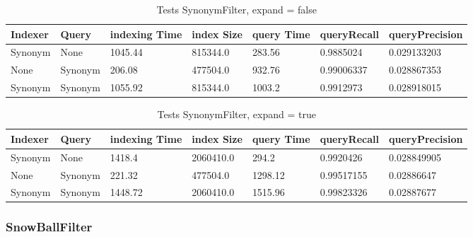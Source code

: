 \begin{table}[!htbp]
    \hspace{-2cm}
                \begin{tabular}{|p{2cm}|p{2cm}|p{2cm}|p{2cm}|p{2.5cm}|p{2.5cm}|p{2.5cm}|}
                    \hline
                    \textbf{Indexer} & \textbf{Query} & \textbf{indexing Time} & \textbf{index Size} & \textbf{query Time} & \textbf{queryRecall} & \textbf{queryPrecision}\\
                    \hline
Synonym & None & 1045.44 & 815344.0 & 283.56 & 0.9885024 & 0.029133203\\
		            \hline
None & Synonym & 206.08 & 477504.0 & 932.76 & 0.99006337 & 0.028867353\\
		            \hline
Synonym & Synonym & 1055.92 & 815344.0 & 1003.2 & 0.9912973 & 0.028918015\\
                    \hline
                \end{tabular}
                \caption{Tests SynonymFilter, expand = false}
                \label{tab:tests_SynonymFilterexpandfalse}
            \end{table}

\begin{table}[!htbp]
    \hspace{-2cm}
                \begin{tabular}{|p{2cm}|p{2cm}|p{2cm}|p{2cm}|p{2.5cm}|p{2.5cm}|p{2.5cm}|}
                    \hline
                    \textbf{Indexer} & \textbf{Query} & \textbf{indexing Time} & \textbf{index Size} & \textbf{query Time} & \textbf{queryRecall} & \textbf{queryPrecision}\\
                    \hline
Synonym & None & 1418.4 & 2060410.0 & 294.2 & 0.9920426 & 0.028849905\\
        \hline
None & Synonym & 221.32 & 477504.0 & 1298.12 & 0.99517155 & 0.02886647\\
        \hline
Synonym & Synonym & 1448.72 & 2060410.0 & 1515.96 & 0.99823326 & 0.02887677\\
                    \hline
                \end{tabular}
                \caption{Tests SynonymFilter, expand = true}
                \label{tab:tests_SynonymFilterexpandtrue}
            \end{table}

\subsubsection{SnowBallFilter}

